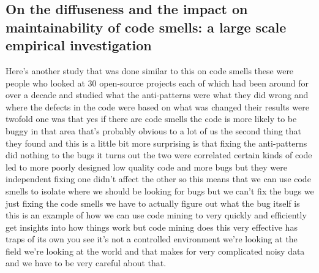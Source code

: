 \documentclass[conference, compsoc, twoside]{IEEEtran}
\begin{document}
\subsection{On the diffuseness and the impact on maintainability of code smells: a large scale empirical investigation}
Here's another study that was done similar to this on code
smells these were people who looked at
30 open-source projects each of which
had been around for over a decade and
studied what the anti-patterns were what
they did wrong and where the defects in
the code were based on what was changed
their results were twofold one was that
yes if there are code smells the code is
more likely to be buggy in that area
that's probably obvious to a lot of us
the second thing that they found and
this is a little bit more surprising is
that
fixing the anti-patterns did nothing to
the bugs it turns out the two were
correlated certain kinds of code led to
more poorly designed low quality code
and more bugs but they were independent
fixing one didn't affect the other so
this means that we can use code smells
to isolate where we should be looking
for bugs but we can't fix the bugs we
just fixing the code smells we have to
actually figure out what the bug itself
is this is an example of how we can use
code mining to very quickly and
efficiently get insights into how things
work but code mining does this very
effective has traps of its own you see
it's not a controlled environment we're
looking at the field we're looking at
the world and that makes for very
complicated noisy data and we have to be
very careful about that.
\end{document}
